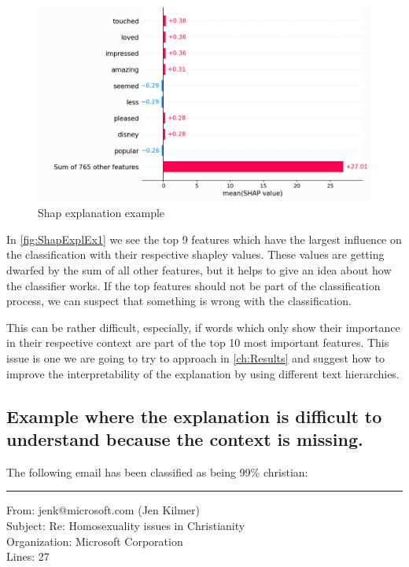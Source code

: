 \begin{figure}[H]
    \centering
    \includegraphics[width=\linewidth]{images/04_shap/ShapExplanationExample1.PNG}
    \caption{Shap explanation example \cite{shapDocs}}
    \label{fig:ShapExplEx1}
\end{figure}

In \autoref{fig:ShapExplEx1} we see the top 9 features which have the largest influence on the classification with their respective shapley values. These values are getting dwarfed by the sum of all other features, but it helps to give an idea about how the classifier works. If the top features should not be part of the classification process, we can suspect that something is wrong with the classification.


This can be rather difficult, especially, if words which only show their importance in their respective context are part of the top 10 most important features. This issue is one we are going to try to approach in \autoref{ch:Results} and suggest how to improve the interpretability of the explanation by using different text hierarchies.


\subsection{Example where the explanation is difficult to understand because the context is missing.}
\label{section:ExplanationExample}

The following email has been classified as being 99\% christian:

\noindent\rule[0.5ex]{\linewidth}{1pt}
From: jenk@microsoft.com (Jen Kilmer)\\
    Subject: Re: Homosexuality issues in Christianity\\
    Organization: Microsoft Corporation\\
    Lines: 27\\
    

